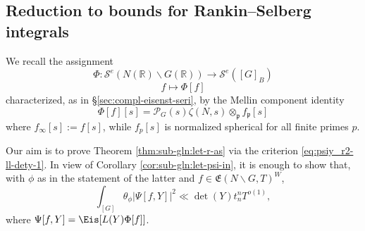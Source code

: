 \subsection{Reduction to bounds for Rankin--Selberg integrals}\label{sec:cq2z5fy3gx}
We recall the assignment
\begin{equation*}
  \Phi : \mathcal{S}^e(N(\mathbb{R}) \backslash G(\mathbb{R})) \rightarrow \mathcal{S}^e([G]_B)
\end{equation*}
\begin{equation*}
  f \mapsto \Phi[f]
\end{equation*}
characterized, as in \S\ref{sec:compl-eisenst-seri}, by the Mellin component identity
\begin{equation}\label{eq:phif_-=-mathc}
  \Phi[f][s] = \mathcal{P}_G(s) \zeta(N,s) \otimes_{\mathfrak{p}} f_\mathfrak{p}[s]
\end{equation}
where $f_\infty[s] := f[s]$, while $f_p[s]$ is normalized spherical for all finite primes $p$.

Our aim is to prove Theorem \ref{thm:sub-gln:let-r-as} via the criterion \eqref{eq:psiy_r2-ll-dety-1}.  In view of Corollary \ref{cor:sub-gln:let-psi-in}, it is enough to show that, with $\phi$ as in the statement of the latter and $f \in \mathfrak{E}(N \backslash G, T)^W$,
\begin{equation}\label{eq:int_g-thet-psiy2}
  \int_{[G]}
  \theta_\phi \left\lvert \Psi[f,Y] \right\rvert^2 \ll
  \det(Y)
  t_n^n  T^{o(1)},
\end{equation}
where $\Psi[f,Y] = \Eis[L(Y) \Phi[f]]$.


